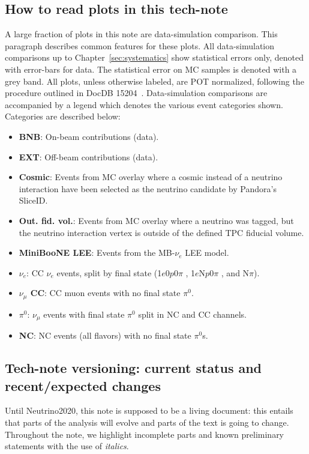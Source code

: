 \documentclass[a4paper]{article}
\newcommand{\npsel}{1$e$N$p$0$\pi$ }
\newcommand{\zpsel}{1$e$0$p$0$\pi$ }
\begin{document}
\subsection{How to read plots in this tech-note} A large fraction of plots in this note are data-simulation comparison. This paragraph describes common features for these plots. All data-simulation comparisons up to Chapter~\ref{sec:systematics} show statistical errors only, denoted with error-bars for data. The statistical error on MC samples is denoted with a grey band. All plots, unless otherwise labeled, are POT normalized, following the procedure outlined in DocDB 15204~\cite{bib:POTscaling}. Data-simulation comparisons are accompanied by a legend which denotes the various event categories shown. Categories are described below:
\begin{itemize}
    \item \textbf{BNB}: On-beam contributions (data).
    \item \textbf{EXT}: Off-beam contributions (data).
    \item \textbf{Cosmic}: Events from MC overlay where a cosmic instead of a neutrino interaction have been selected as the neutrino candidate by Pandora's SliceID.
    \item \textbf{Out. fid. vol.}: Events from MC overlay where a neutrino was tagged, but the neutrino interaction vertex is outside of the defined TPC fiducial volume.
    \item \textbf{MiniBooNE LEE}: Events from the MB-$\nu_e$ LEE model.
    \item \textbf{$\nu_e$}: CC $\nu_e$ events, split by final state (\zpsel, \npsel, and N$\pi$).
    \item \textbf{$\nu_{\mu}$ CC}: CC muon events with no final state $\pi^0$.
    \item \textbf{$\pi^0$}: $\nu_{\mu}$ events with final state $\pi^0$ split in NC and CC channels.
    \item \textbf{NC}: NC events (all flavors) with no final state $\pi^0$s.
\end{itemize}{}

\subsection{Tech-note versioning: current status and recent/expected changes }
Until Neutrino2020, this note is supposed to be a living document: this entails that parts of the analysis will evolve and parts of the text is going to change. Throughout the note, we highlight incomplete parts and known preliminary statements with the use of \emph{italics}.
\end{document}
